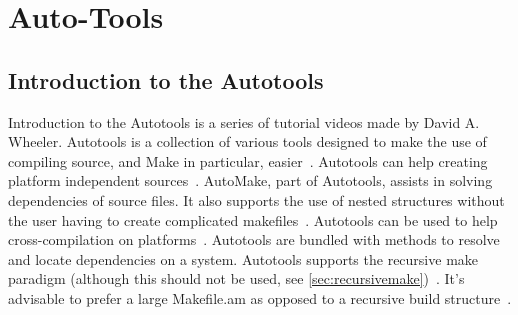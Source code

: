 
\section{Auto-Tools}
\subsection{Introduction to the Autotools}
Introduction to the Autotools is a series of tutorial videos made by David A. Wheeler\cite{wheeler2012autopart1,wheeler2012autopart2,wheeler2012autopart3}.
Autotools is a collection of various tools designed to make the use of compiling source, and Make in particular, easier~\citep{wheeler2012autopart1}. Autotools can help creating platform independent sources~\citep{wheeler2012autopart1}. AutoMake, part of Autotools,  assists in solving dependencies of source files. It also supports the use of nested structures without the user having to create complicated makefiles~\cite{wheeler2012autopart2}. Autotools can be used to help cross-compilation on platforms~\citep{wheeler2012autopart2}. Autotools are bundled with methods to resolve and locate dependencies on a system.
Autotools supports the recursive make paradigm (although this should not be used, see \ref{sec:recursivemake})~\citep{wheeler2012autopart3}. It's advisable to prefer a large Makefile.am as opposed to a recursive build structure~\citep{miller1998recursive,wheeler2012autopart3}.

